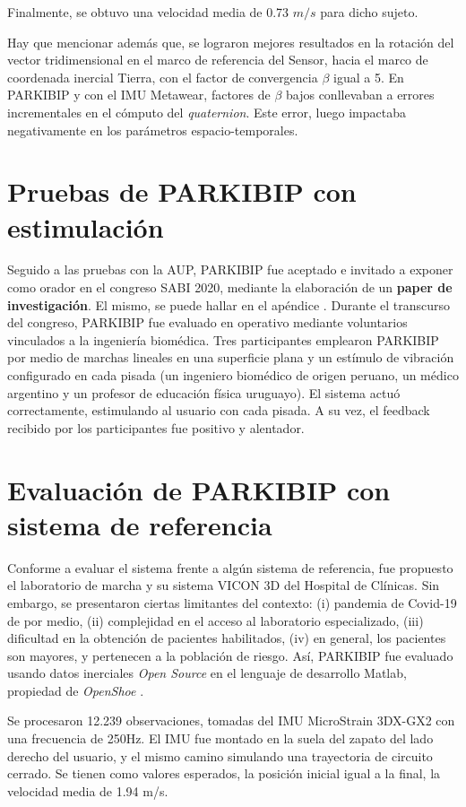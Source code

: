 Finalmente, se obtuvo una velocidad media de 0.73 $m/s$ para dicho sujeto.

Hay que mencionar además que, se lograron mejores resultados en la rotación del vector tridimensional en el marco de referencia del Sensor, hacia el marco de coordenada inercial Tierra, con el factor de convergencia $\beta$ igual a 5. En PARKIBIP y con el IMU Metawear, factores de $\beta$ bajos conllevaban a errores incrementales en el cómputo del \textit{quaternion}. Este error, luego impactaba negativamente en los parámetros espacio-temporales.

\section{Pruebas de PARKIBIP con estimulación}

Seguido a las pruebas con la AUP, PARKIBIP fue aceptado e invitado a exponer como orador en el congreso SABI 2020, mediante la elaboración de un \textbf{paper de investigación}. El mismo, se puede hallar en el apéndice . Durante el transcurso del congreso, PARKIBIP fue evaluado en operativo mediante voluntarios vinculados a la ingeniería biomédica. Tres participantes emplearon PARKIBIP por medio de marchas lineales en una superficie plana y un estímulo de vibración configurado en cada pisada (un ingeniero biomédico de origen peruano, un médico argentino y un profesor de educación física uruguayo). El sistema actuó correctamente, estimulando al usuario con cada pisada.  A su vez, el feedback recibido por los participantes fue positivo y alentador.

\section{Evaluación de PARKIBIP con sistema de referencia}

Conforme a evaluar el sistema frente a algún sistema de referencia, fue propuesto el laboratorio de marcha y su sistema VICON 3D del Hospital de Clínicas. Sin embargo, se presentaron ciertas limitantes del contexto: (i) pandemia de Covid-19 de por medio, (ii) complejidad en el acceso al laboratorio especializado, (iii) dificultad en la obtención de pacientes habilitados, (iv) en general, los pacientes son mayores, y pertenecen a la población de riesgo. Así, PARKIBIP fue evaluado usando datos inerciales \textit{Open Source} en el lenguaje de desarrollo Matlab, propiedad de \textit{OpenShoe} \cite{openshoe}.

Se procesaron 12.239 observaciones, tomadas del IMU  MicroStrain 3DX-GX2 con una frecuencia de 250Hz. El IMU fue montado en la suela del zapato del lado derecho del usuario, y el mismo camino simulando una trayectoria de circuito cerrado. Se tienen como valores esperados, la posición inicial igual a la final, la velocidad media de 1.94 m/s.

